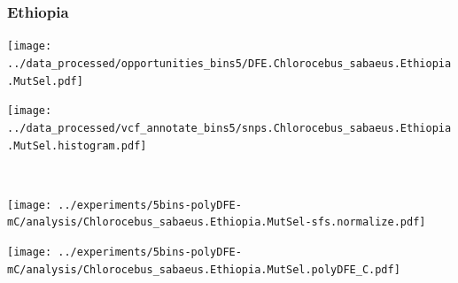 \subsubsection{Ethiopia}

\begin{minipage}{0.49\linewidth}
    \texttt{[image: ../data\_processed/opportunities\_bins5/DFE.Chlorocebus\_sabaeus.Ethiopia.MutSel.pdf]}
\end{minipage}
\begin{minipage}{0.49\linewidth}
    \texttt{[image: ../data\_processed/vcf\_annotate\_bins5/snps.Chlorocebus\_sabaeus.Ethiopia.MutSel.histogram.pdf]}
\end{minipage}
\\
\begin{minipage}{0.49\linewidth}
    \texttt{[image: ../experiments/5bins-polyDFE-mC/analysis/Chlorocebus\_sabaeus.Ethiopia.MutSel-sfs.normalize.pdf]}
\end{minipage}
\begin{minipage}{0.4\linewidth}
    \texttt{[image: ../experiments/5bins-polyDFE-mC/analysis/Chlorocebus\_sabaeus.Ethiopia.MutSel.polyDFE\_C.pdf]}
\end{minipage}
